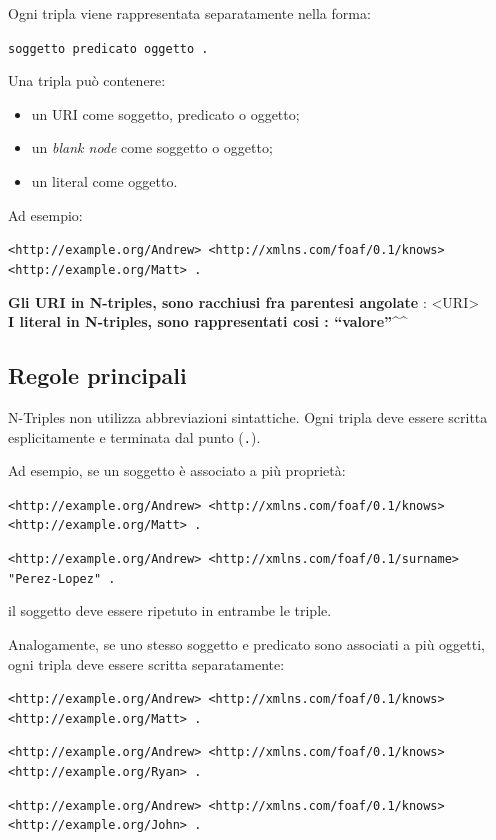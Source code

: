 Ogni tripla viene rappresentata separatamente nella forma:

\begin{center}
\texttt{soggetto predicato oggetto .}
\end{center}

Una tripla può contenere:

\begin{itemize}

\item un URI come soggetto, predicato o oggetto;
\item un \textit{blank node} come soggetto o oggetto;
\item un literal come oggetto.

\end{itemize}

Ad esempio:

\begin{center}
\texttt{<http://example.org/Andrew> <http://xmlns.com/foaf/0.1/knows> <http://example.org/Matt> .}
\end{center}
\textbf{Gli URI in N-triples, sono racchiusi fra parentesi angolate} : <URI> \\
\textbf{I literal in N-triples, sono rappresentati cosi : ``valore''\textasciicircum\textasciicircum<URI-datatype>}

\subsection*{Regole principali}

N-Triples non utilizza abbreviazioni sintattiche. Ogni tripla deve essere scritta esplicitamente e terminata dal punto (\texttt{.}).

Ad esempio, se un soggetto è associato a più proprietà:

\begin{center}
\texttt{<http://example.org/Andrew> <http://xmlns.com/foaf/0.1/knows> <http://example.org/Matt> .} 

\texttt{<http://example.org/Andrew> <http://xmlns.com/foaf/0.1/surname> "Perez-Lopez" .}

\end{center}

il soggetto deve essere ripetuto in entrambe le triple.

Analogamente, se uno stesso soggetto e predicato sono associati a più oggetti, ogni tripla deve essere scritta separatamente:

\begin{center}
\texttt{<http://example.org/Andrew> <http://xmlns.com/foaf/0.1/knows> <http://example.org/Matt> .}


\texttt{<http://example.org/Andrew> <http://xmlns.com/foaf/0.1/knows> <http://example.org/Ryan> .}

\texttt{<http://example.org/Andrew> <http://xmlns.com/foaf/0.1/knows> <http://example.org/John> .}


\end{center}

